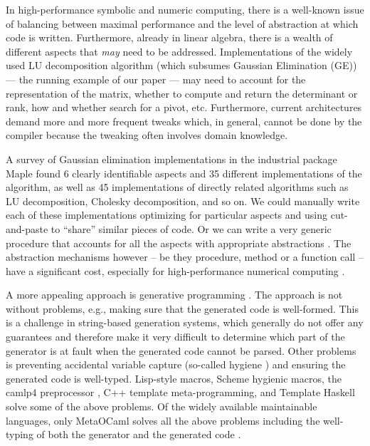 \documentclass[draft]{elsart}
\begin{document}
In high-performance symbolic and numeric computing, there is a
well-known issue of balancing between maximal performance and the
level of abstraction at which code is written.  Furthermore, already
in linear algebra, there is a wealth of different aspects that
\emph{may} need to be addressed. Implementations of the
widely used LU decomposition algorithm (which subsumes Gaussian 
Elimination (GE)) --- the running
example of our paper --- may need to account for the representation of
the matrix, whether to compute and return the determinant or rank, how
and whether search for a pivot, etc. Furthermore, current architectures
demand more and more frequent tweaks which, in general, cannot be done by the
compiler because the tweaking often involves domain knowledge. 

A survey \cite{Carette06} of
Gaussian elimination implementations in the industrial package Maple
\cite{Monagan:2001:M7P}
found 6 clearly identifiable aspects and 35 different implementations of the
algorithm, as well as 45 implementations of directly related algorithms such as
LU decomposition, Cholesky decomposition, and so on.  We could
manually write each of these implementations optimizing for particular aspects
and using cut-and-paste to ``share'' similar pieces of code.
Or we can write a very generic procedure that accounts for
all the aspects with appropriate abstractions \cite{Gruntz:1994:IG,Axiom}. The
abstraction mechanisms however -- be they procedure, method or a
function call -- have a significant cost, especially for
high-performance numerical computing \cite{Carette06}. 

A more appealing approach is generative programming
\cite{Czarnecki,Veldhuizen:1998:ISCOPE,musser89generic,musser94algorithmoriented,BOOST,POOMA,ATLAS}.
The approach is not without problems, e.g., making sure that the
generated code is well-formed. This is a challenge in string-based
generation systems, which generally do not offer any guarantees and
therefore make it very difficult to determine which part of the
generator is at fault when the generated code cannot be parsed. Other
problems is preventing accidental variable capture (so-called hygiene
\cite{HygienicMacros}) and ensuring the generated code is
well-typed. Lisp-style macros, Scheme hygienic macros, the camlp4
preprocessor \cite{camlp4}, C++ template meta-programming, and Template
Haskell \cite{conf/dagstuhl/CzarneckiOST03} solve some of the above
problems. Of the widely available maintainable languages, only
MetaOCaml \cite{CTHL03,metaocaml-org}  solves all the above problems
including the well-typing of both the generator and 
the generated code \cite{TahaSheard97,TahaThesis}.
\end{document}
